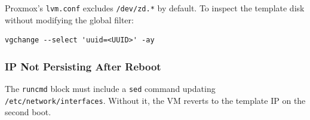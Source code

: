 Proxmox's \texttt{lvm.conf} excludes \texttt{/dev/zd.*} by default. To inspect the template disk without modifying the global filter:

\begin{lstlisting}
vgchange --select 'uuid=<UUID>' -ay
\end{lstlisting}

\subsubsection{IP Not Persisting After Reboot}

The \texttt{runcmd} block must include a \texttt{sed} command updating \texttt{/etc/network/interfaces}. Without it, the VM reverts to the template IP on the second boot.
